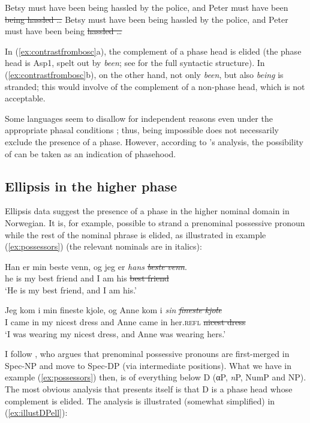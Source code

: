 \documentclass[output=paper]{langsci/langscibook}
\begin{document}
\ea\label{ex:contrastfrombosc}
	\ea Betsy must have been being hassled by the police, and Peter must have been \sout{being hassled \dots}
    \ex *Betsy must have been being hassled by the police, and Peter must have been being \sout{hassled \dots}
	\z
\z

\noindent In (\ref{ex:contrastfrombosc}a), the complement of a phase head is
elided (the phase head is Asp1, spelt out by \emph{been}; see
\citealt[62]{Boskovic2014} for the full syntactic structure).  In
(\ref{ex:contrastfrombosc}b), on the other hand, not only \emph{been}, but also
\emph{being} is stranded; this would involve  of the complement of a
non-phase head, which is not acceptable.

Some languages seem to disallow  for independent reasons even
under the appropriate phasal conditions \citep[48]{Boskovic2014}; thus,
 being impossible does not necessarily exclude the presence of a
phase.  However, according to \citeauthor{Boskovic2014}'s analysis,
the possibility of  can be taken as an indication of phasehood.

\subsection{Ellipsis in the higher phase}

Ellipsis data suggest the presence of a phase in the higher nominal domain in
Norwegian. It is, for example, possible to strand a prenominal possessive
pronoun while the rest of the nominal phrase is elided, as illustrated in
example (\ref{ex:possessors}) (the relevant nominals are in italics):

\ea\label{ex:possessors} 
		\ea
		 \gll Han er min beste venn, og jeg er \textit{hans} \sout{\textit{beste} \textit{venn}}.\\
		 he is my best friend and I am his \sout{best friend}\\
		 \glt `He is my best friend, and I am his.'

		\ex
		\gll Jeg kom i min fineste kjole, og Anne kom i \textit{sin} \sout{\textit{fineste} \textit{kjole}}\\
		I came in my nicest dress and Anne came in her.\textsc{refl} \sout{nicest dress}\\
		\glt `I was wearing my nicest dress, and Anne was wearing hers.'

		\z
\z

\noindent I follow \citet[207, 210]{julien2005nominal}, who argues that
prenominal possessive pronouns are first-merged in Spec-NP and move to Spec-DP
(via intermediate positions). What we have in example (\ref{ex:possessors})
then, is  of everything below D (αP, \emph{n}P, NumP and NP).
The most obvious analysis that presents itself is that D is a phase
head whose complement is elided. The analysis is illustrated (somewhat
simplified) in (\ref{ex:illustDPell}):
\end{document}
